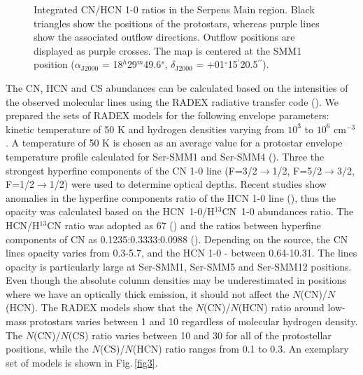\documentclass[a4paper]{article}
\begin{document}
\begin{figure}[!h]
\centering
{}
\caption{Integrated CN/HCN 1-0 ratios in the Serpens Main region. Black triangles show the positions of the protostars, whereas purple lines show the associated outflow directions. Outflow positions are displayed as purple crosses. The map is centered at the SMM1 position ($\alpha_\mathrm{J2000}$ = 18$^h$29$^m$49.6$^s$, $\delta_\mathrm{J2000}$ = +01$^{\circ}$15$^{\prime}$20.5$^{\prime\prime}$).}
\label{fig2}
\end{figure}

\indent \indent The CN, HCN and CS abundances can be calculated based on the intensities of the observed molecular lines using the RADEX radiative transfer code (\cite{tak2007}). We prepared the sets of RADEX models for the following envelope parameters: kinetic temperature of 50 K and hydrogen densities varying from $10^3$ to $10^6$ cm$^{-3}$. A temperature of 50 K is chosen as an average value for a protostar envelope temperature profile calculated for Ser-SMM1 and Ser-SMM4 (\cite{kristensen2010}). Three the strongest hyperfine components of the CN 1-0 line (F=3/2$\rightarrow$1/2, F=5/2$\rightarrow$3/2, F=1/2$\rightarrow$1/2) were used to determine optical depths. Recent studies show anomalies in the hyperfine components ratio of the HCN 1-0 line (\cite{loughnane2012}), thus the opacity was calculated based on the \mbox{HCN 1-0/H$^{13}$CN 1-0} abundances ratio. The HCN/H$^{13}$CN ratio was adopted as 67 (\cite{yan2019}) and the ratios between hyperfine components of CN as 0.1235:0.3333:0.0988 (\cite{skatrud1983}). Depending on the source, the CN lines opacity varies from 0.3-5.7, and the HCN 1-0 - between 0.64-10.31. The lines opacity is particularly large at Ser-SMM1, Ser-SMM5 and Ser-SMM12 positions. Even though the absolute column densities may be underestimated in positions where we have an optically thick emission, it should not affect the $N$(CN)/$N$(HCN). The RADEX models show that the $N$(CN)/$N$(HCN) ratio around low-mass protostars varies between 1 and 10 regardless of molecular hydrogen density. The $N$(CN)/$N$(CS) ratio varies between 10 and 30 for all of the protostellar positions, while the $N$(CS)/$N$(HCN) ratio ranges from 0.1 to 0.3. An exemplary set of models is shown in Fig.\,\ref{fig3}.
\end{document}
